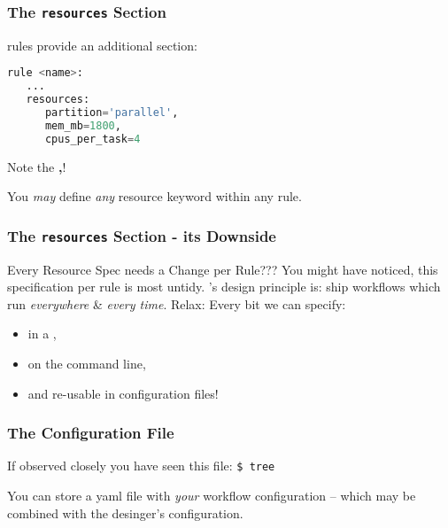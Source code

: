 \begin{frame}[fragile]
  \frametitle{The \Snakemake{} \texttt{resources} Section}
  \Snakemake{} rules provide an additional  section:
  \begin{lstlisting}[language=Python,style=Python]
rule <name>:
   ...
   resources:
      partition='parallel',
      mem_mb=1800,
      cpus_per_task=4
  \end{lstlisting}
  \begin{hint}
  	Note the \textbf{,}!
  \end{hint}
  \pause
  \begin{docs}
  	You \emph{may} define \emph{any} resource keyword within any rule.
  \end{docs}
\end{frame}

\begin{frame}
  \frametitle{The \Snakemake{} \texttt{resources} Section - its Downside}
  \begin{block}{Every Resource Spec needs a Change per Rule???}
   You might have noticed, this specification per rule is most untidy. \Snakemake's design principle is: ship workflows which run \emph{everywhere} \& \emph{every time}.
   \newline \pause
   Relax: Every bit we can specify:
   \begin{itemize}
    \item in a ,
    \item on the command line,
    \item and re-usable in configuration files!
   \end{itemize}

  \end{block}

\end{frame} 

\begin{frame}
  \frametitle{The Configuration File}
  If observed closely you have seen this file:\newline
            {\tiny \DTsetlength{0.2em}{1em}{0.2em}{0.4pt}{.6pt}
\texttt{\$ tree}
}
 \pause
 \begin{docs}
 	You can store a yaml file with \emph{your} workflow configuration -- which may be combined with the desinger's configuration.
 \end{docs}
\end{frame}

